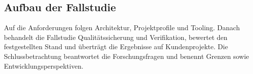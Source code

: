 \subsection{Aufbau der Fallstudie}
\label{subsec:aufbau-der-fallstudie}

Auf die Anforderungen folgen Architektur, Projektprofile und Tooling. Danach
behandelt die Fallstudie Qualitätssicherung und Verifikation, bewertet den
festgestellten Stand und überträgt die Ergebnisse auf Kundenprojekte. Die
Schlussbetrachtung beantwortet die Forschungsfragen und benennt Grenzen sowie
Entwicklungsperspektiven.
